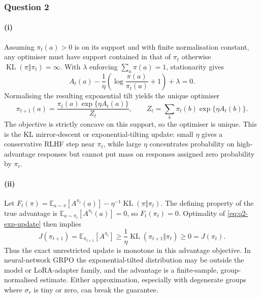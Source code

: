 \documentclass[11pt,a4paper]{article}
\begin{document}
\subsubsection*{Question 2}

\paragraph{(i)}
Assuming $\pi_t(a)>0$ is on its support and with finite normalisation constant, any optimiser must have support contained in that of $\pi_t$ otherwise $\operatorname{KL}(\pi\Vert\pi_t)=\infty$.
With $\lambda$ enforcing $\sum_a\pi(a)=1$, stationarity gives
\[
    A_t(a)-\frac{1}{\eta}
       \left(\log\frac{\pi(a)}{\pi_t(a)}+1\right)+\lambda=0.
\]
Normalising the resulting exponential tilt yields the unique optimiser
\begin{equation}
    \pi_{t+1}(a)
    =\frac{\pi_t(a)\exp\{\eta A_t(a)\}}
           {Z_t},
    \qquad
    Z_t=\sum_b\pi_t(b)\exp\{\eta A_t(b)\}.
    \label{eq:q2-exp-update}
\end{equation}
The objective is strictly concave on this support, so the optimiser is
unique.  This is the KL mirror-descent or exponential-tilting update:
small $\eta$ gives a conservative RLHF step near $\pi_t$, while large
$\eta$ concentrates probability on high-advantage responses but cannot put
mass on responses assigned zero probability by $\pi_t$.

\paragraph{(ii)}
Let
$F_t(\pi)=\mathbb{E}_{a\sim\pi}[A^{\pi_t}(a)]
-\eta^{-1}\operatorname{KL}(\pi\Vert\pi_t)$.
The defining property of the true advantage is
$\mathbb{E}_{a\sim\pi_t}[A^{\pi_t}(a)]=0$, so $F_t(\pi_t)=0$.  Optimality
of \cref{eq:q2-exp-update} then implies
\[
    J(\pi_{t+1})
    =\mathbb{E}_{\pi_{t+1}}[A^{\pi_t}]
    \geq \frac{1}{\eta}\operatorname{KL}(\pi_{t+1}\Vert\pi_t)
    \geq 0
    =J(\pi_t).
\]
Thus the exact unrestricted update is monotone in this advantage objective.
In neural-network GRPO the exponential-tilted distribution may be outside
the model or LoRA-adapter family, and the advantage is a finite-sample,
group-normalised estimate.  Either approximation, especially with degenerate
groups where $\sigma_r$ is tiny or zero, can break the guarantee.
\end{document}
